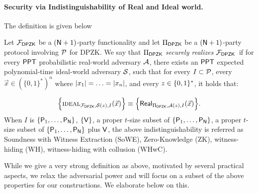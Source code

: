 \paragraph{Security via Indistinguishability of Real and Ideal world.} The definition is given below
\begin{definition}
Let $\mathcal{F}_{\mathsf{DPZK}}$ be a $(\mathsf{N}+1)$-party  functionality and let $\Pi_{\mathsf{DPZK}}$ be a $(\mathsf{N}+1)$-party protocol involving $\mathcal{P}$ for DPZK. We say that  $\Pi_{\mathsf{DPZK}}$ {\em securely realizes} $\mathcal{F}_{\mathsf{DPZK}}$~if for every $\mathsf{PPT}$ probabilistic  real-world adversary $\mathcal{A}$, there exists an $\mathsf{PPT}$  expected polynomial-time ideal-world adversary $\mathcal{S}$, such that for every $I \subset \mathcal{P}$, every $\vec{x} \in (\{0,1\}^*)^n$ where $\left\lvert x_1 \right\rvert = \ldots= \left\lvert x_n \right\rvert$, and every $z \in \{0,1\}^*$, it holds that:
	
	$$\Big\{\textsc{ideal}_{\mathcal{F}_{\mathsf{DPZK}}, \mathcal{S}(z),I}(\vec{x}) \Big\} \equiv \Big\{ \mathsf{Real}_{\Pi_{\mathsf{DPZK}}, \mathcal{A}(z),I}(\vec{x}) \Big\}. $$
When $I$ is  $\{\mathsf{P}_1,\ldots,\mathsf{P}_{\mathsf{N}}\}$, $\{\mathsf{V}\}$, a proper $t$-size subset of $\{\mathsf{P}_1,\ldots,\mathsf{P}_{\mathsf{N}}\}$, a proper $t$-size subset of $\{\mathsf{P}_1,\ldots,\mathsf{P}_{\mathsf{N}}\}$ plus   $\mathsf{V}$, the above indistinguishability  is referred as Soundness with Witness Extraction (SoWE), Zero-Knowledge (ZK), witness-hiding (WH), witness-hiding with collusion (WHwC).   	
\end{definition}

While we give a very strong definition as above, motivated by several practical aspects, we relax the adversarial power and will focus on a subset of the above properties for our constructions. We elaborate below on this.

